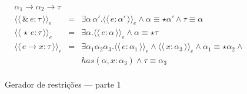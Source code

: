 \documentclass[a4paper,8pt]{article}
\newcommand{\constre}[1]{\ensuremath{\langle\langle\,#1\,\rangle\rangle_{e}}}
\begin{document}
\begin{figure}[h]
\[{\begin{array}{lcl}
{                                                      \alpha_1\to\alpha_2\to\tau}\\
                     \constre{\&\,e : \tau} & = & \exists \alpha\,
                                                 \alpha'. \constre{e :
                                                 \alpha'} \land
                                                 \alpha \equiv \star \alpha'
                                                 \land \tau \equiv \alpha\\
                     \constre{\star\,e : \tau} & = & \exists
                                                    \alpha. \constre{e
                                                    : \alpha} \land
                                                    \alpha \equiv \star \tau\\
                     \constre{e\to x : \tau} & = & \exists
                                                  \alpha_1\alpha_2\alpha_3. \constre{e
                                                  :\alpha_1} \land
                                                  \constre{x :
                                                  \alpha_3} \land
                                                  \alpha_1 \equiv \star\alpha_2
                                                  \land\\
                          & & has(\alpha,x : \alpha_3) \land \tau
                              \equiv \alpha_3\\
            \end{array}}
       \]
       \centering
       \caption{Gerador de restrições --- parte 1}
       \label{figgen1}
     \end{figure}
\end{document}
